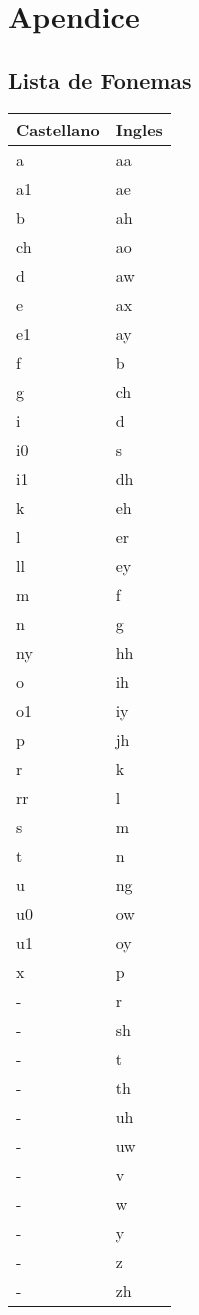 \section{Apendice}
\subsection{Lista de Fonemas}
\begin{center}
 \begin{tabular}{ | l | l |}
 \hline
Castellano & Ingles \\ \hline
a & aa \\ \hline
a1 & ae \\ \hline
b & ah \\ \hline
ch & ao \\ \hline
d & aw \\ \hline
e & ax \\ \hline
e1 & ay \\ \hline
f & b \\ \hline
g & ch \\ \hline
i & d \\ \hline
i0 & s \\ \hline
i1 & dh \\ \hline
k & eh \\ \hline
l & er \\ \hline
ll & ey \\ \hline
m & f \\ \hline
n & g \\ \hline
ny & hh \\ \hline
o & ih \\ \hline
o1 & iy \\ \hline
p & jh \\ \hline
r & k \\ \hline
rr & l \\ \hline
s & m \\ \hline 
t & n \\ \hline
u & ng \\ \hline
u0 & ow \\ \hline 
u1 & oy \\ \hline
x & p \\ \hline
- & r \\ \hline
- & sh \\ \hline
- &t \\ \hline
- &th \\ \hline
- &uh \\ \hline
- &uw \\ \hline
- &v \\ \hline
- &w \\ \hline
- &y \\ \hline
- &z \\ \hline
- &zh \\
    \hline
    \end{tabular}
\end{center}

